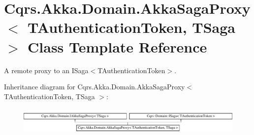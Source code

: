 \hypertarget{classCqrs_1_1Akka_1_1Domain_1_1AkkaSagaProxy}{}\section{Cqrs.\+Akka.\+Domain.\+Akka\+Saga\+Proxy$<$ T\+Authentication\+Token, T\+Saga $>$ Class Template Reference}
\label{classCqrs_1_1Akka_1_1Domain_1_1AkkaSagaProxy}


A remote proxy to an I\+Saga$<$\+T\+Authentication\+Token$>$.  


Inheritance diagram for Cqrs.\+Akka.\+Domain.\+Akka\+Saga\+Proxy$<$ T\+Authentication\+Token, T\+Saga $>$\+:\begin{figure}[H]
\begin{center}
\leavevmode
\includegraphics[height=1.372549cm]{classCqrs_1_1Akka_1_1Domain_1_1AkkaSagaProxy}
\end{center}
\end{figure}
